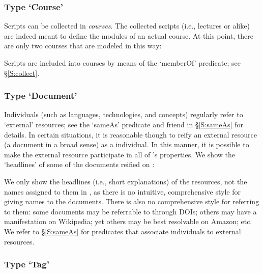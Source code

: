 \subsubsection{Type `Course'}

Scripts can be collected in \emph{courses}. The collected scripts
(i.e., lectures or alike) are indeed meant to define the modules of an
actual course. At this point, there are only two courses that are
modeled in this way:



\noindent
Scripts are included into courses by means of the `memberOf'
predicate; see \S\ref{S:collect}.


\subsubsection{Type `Document'}

Individuals (such as languages, technologies, and concepts) regularly
refer to `external' resources; see the `sameAs' predicate and friend
in \S\ref{S:sameAs} for details. In certain situations, it is
reasonable though to reify an external resource (a document in a broad
sense) as a \solasote{} individual. In this manner, it is possible to
make the external resource participate in all of \solasote{}'s
properties. We show the `headlines' of some of the documents reified
on \solasote:



\noindent
We only show the headlines (i.e., short explanations) of the
resources, not the names assigned to them in \solasote, as there is no
intuitive, comprehensive style for giving names to the
documents. There is also no comprehensive style for referring to them:
some documents may be referrable to through DOIs; others may have a
manifestation on Wikipedia; yet others may be best resolvable on
Amazon; etc. We refer to \S\ref{S:sameAs} for predicates that
associate \solasote{} individuals to external resources.


\subsubsection{Type `Tag'}

